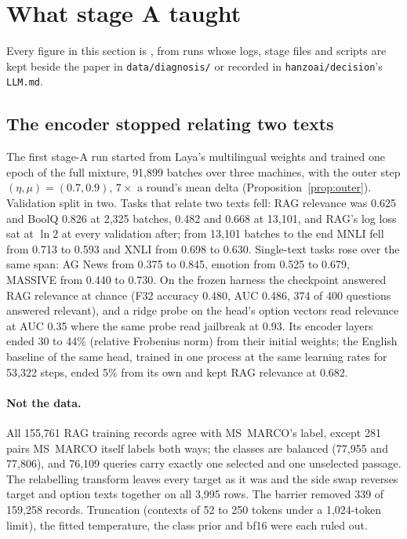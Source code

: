 \section{What stage A taught}
\label{sec:findings}

Every figure in this section is \meas{}, from runs whose logs, stage files and
scripts are kept beside the paper in \texttt{data/diagnosis/} or recorded in
\texttt{hanzoai/decision}'s \texttt{LLM.md}.

\subsection{The encoder stopped relating two texts}
\label{sec:collapse}

The first stage-A run started from Laya's multilingual weights and trained one
epoch of the full mixture, 91{,}899 batches over three machines, with the outer
step $(\eta, \mu) = (0.7, 0.9)$, $7\times$ a round's mean delta
(Proposition~\ref{prop:outer}). Validation split in two. Tasks that relate two
texts fell: RAG relevance was 0.625 and BoolQ 0.826 at 2{,}325 batches, 0.482
and 0.668 at 13{,}101, and RAG's log loss sat at $\ln 2$ at every validation
after; from 13{,}101 batches to the end MNLI fell from 0.713 to 0.593 and XNLI
from 0.698 to 0.630. Single-text tasks rose over the same span: AG News from
0.375 to 0.845, emotion from 0.525 to 0.679, MASSIVE from 0.440 to 0.730. On the
frozen harness the checkpoint answered RAG relevance at chance (F32 accuracy
0.480, AUC 0.486, 374 of 400 questions answered relevant), and a ridge probe on
the head's option vectors read relevance at AUC 0.35 where the same probe read
jailbreak at 0.93. Its encoder layers ended 30 to 44\% (relative Frobenius
norm) from their initial weights; the English baseline of the same head,
trained in one process at the same learning rates for 53{,}322 steps, ended 5\%
from its own and kept RAG relevance at 0.682.

\paragraph{Not the data.}
All 155{,}761 RAG training records agree with MS~MARCO's 
label, except 281 pairs MS~MARCO itself labels both ways; the classes are
balanced (77{,}955 and 77{,}806), and 76{,}109 queries carry exactly one
selected and one unselected passage. The relabelling transform leaves every
target as it was and the side swap reverses target and option texts together
on all 3{,}995 rows. The barrier removed 339 of 159{,}258 records. Truncation
(contexts of 52 to 250 tokens under a 1{,}024-token limit), the fitted
temperature, the class prior and bf16 were each ruled out.


